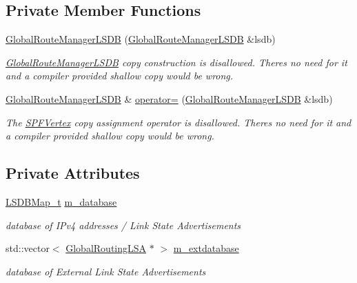 \subsection*{Private Member Functions}
\begin{DoxyCompactItemize}
\item 
\hyperlink{classns3_1_1GlobalRouteManagerLSDB_a843752b649f5f87b0c3995ba02d3a5b6}{Global\+Route\+Manager\+L\+S\+DB} (\hyperlink{classns3_1_1GlobalRouteManagerLSDB}{Global\+Route\+Manager\+L\+S\+DB} \&lsdb)
\begin{DoxyCompactList}\small\item\em \hyperlink{classns3_1_1GlobalRouteManagerLSDB}{Global\+Route\+Manager\+L\+S\+DB} copy construction is disallowed. There\textquotesingle{}s no need for it and a compiler provided shallow copy would be wrong. \end{DoxyCompactList}\item 
\hyperlink{classns3_1_1GlobalRouteManagerLSDB}{Global\+Route\+Manager\+L\+S\+DB} \& \hyperlink{classns3_1_1GlobalRouteManagerLSDB_a3d9f36caf416f708411966e5edbb2c2c}{operator=} (\hyperlink{classns3_1_1GlobalRouteManagerLSDB}{Global\+Route\+Manager\+L\+S\+DB} \&lsdb)
\begin{DoxyCompactList}\small\item\em The \hyperlink{classns3_1_1SPFVertex}{S\+P\+F\+Vertex} copy assignment operator is disallowed. There\textquotesingle{}s no need for it and a compiler provided shallow copy would be wrong. \end{DoxyCompactList}\end{DoxyCompactItemize}
\subsection*{Private Attributes}
\begin{DoxyCompactItemize}
\item 
\hyperlink{classns3_1_1GlobalRouteManagerLSDB_a1422d1cc4a1e5a1122563e6ec4c12758}{L\+S\+D\+B\+Map\+\_\+t} \hyperlink{classns3_1_1GlobalRouteManagerLSDB_a87c05048fb7b513f7bd1e923f7d075a8}{m\+\_\+database}
\begin{DoxyCompactList}\small\item\em database of I\+Pv4 addresses / Link State Advertisements \end{DoxyCompactList}\item 
std\+::vector$<$ \hyperlink{classns3_1_1GlobalRoutingLSA}{Global\+Routing\+L\+SA} $\ast$ $>$ \hyperlink{classns3_1_1GlobalRouteManagerLSDB_a71a8e59e594b19f9284b3f06e80ee770}{m\+\_\+extdatabase}
\begin{DoxyCompactList}\small\item\em database of External Link State Advertisements \end{DoxyCompactList}\end{DoxyCompactItemize}


